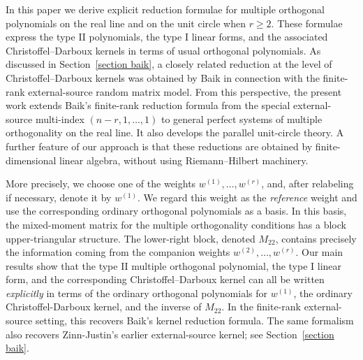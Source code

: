 \documentclass[a4paper,10pt,leqno]{amsart}
\numberwithin{equation}{section}
\theoremstyle{remark}
\newcommand{\blue}[1]{{\color{blue} #1}}
\begin{document}
In this paper we derive explicit reduction formulae for multiple orthogonal polynomials on the real line and on the unit circle when $r \geq 2$. These formulae express the type II polynomials, the type I linear forms, and the associated Christoffel--Darboux kernels in terms of usual orthogonal polynomials. As discussed in Section~\ref{section baik}, a closely related reduction at the level of Christoffel--Darboux kernels was obtained by Baik \cite{Bai09} in connection with the finite-rank external-source random matrix model. From this perspective, the present work extends Baik's finite-rank reduction formula from the special external-source multi-index $(n-r,1,\ldots,1)$ to general perfect systems of multiple orthogonality on the real line. It also develops the parallel unit-circle theory. A further feature of our approach is that these reductions are obtained by finite-dimensional linear algebra, without using Riemann--Hilbert machinery.



More precisely, we choose one of the weights \(w^{(1)},\ldots,w^{(r)}\),
and, after relabeling if necessary, denote it by \(w^{(1)}\).  We regard this
weight as the \textit{reference}
weight and use the corresponding ordinary orthogonal polynomials as a basis. 
In this basis, the mixed-moment matrix for the multiple orthogonality conditions has a
block upper-triangular structure.  The lower-right block, denoted \(M_{22}\),
contains precisely the information coming from the companion weights
\(w^{(2)},\ldots,w^{(r)}\).  Our main results show that the type II multiple
orthogonal polynomial, the type I linear form, and the corresponding
Christoffel--Darboux kernel can all be written \textit{explicitly} in terms of the
ordinary orthogonal polynomials for \(w^{(1)}\), the ordinary
Christoffel-Darboux kernel, and the inverse of \(M_{22}\). In the finite-rank external-source setting, this recovers Baik's kernel
reduction formula.  The same formalism also recovers Zinn-Justin's earlier
external-source kernel; see
Section~\ref{section baik}.
\end{document}
